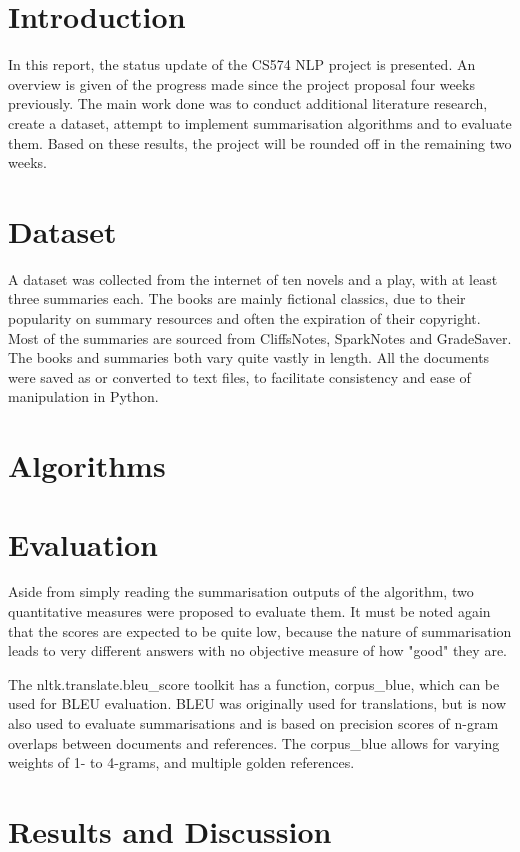 \section{Introduction}
In this report, the status update of the CS574 NLP project is presented. An overview is given of the progress made since the project proposal four weeks previously. The main work done was to conduct additional literature research, create a dataset, attempt to implement summarisation algorithms and to evaluate them. Based on these results, the project will be rounded off in the remaining two weeks.

\section{Dataset}
A dataset was collected from the internet of ten novels and a play, with at least three summaries each. The books are mainly fictional classics, due to their popularity on summary resources and often the expiration of their copyright. Most of the summaries are sourced from CliffsNotes, SparkNotes and GradeSaver. The books and summaries both vary quite vastly in length. All the documents were saved as or converted to text files, to facilitate consistency and ease of manipulation in Python.

\section{Algorithms}

\section{Evaluation}
Aside from simply reading the summarisation outputs of the algorithm, two quantitative measures were proposed to evaluate them. It must be noted again that the scores are expected to be quite low, because the nature of summarisation leads to very different answers with no objective measure of how "good" they are. 

The nltk.translate.bleu\_score toolkit has a function, corpus\_blue, which can be used for BLEU evaluation. BLEU was originally used for translations, but is now also used to evaluate summarisations and is based on precision scores of n-gram overlaps between documents and references. The corpus\_blue allows for varying weights of 1- to 4-grams, and multiple golden references. 


\section{Results and Discussion}